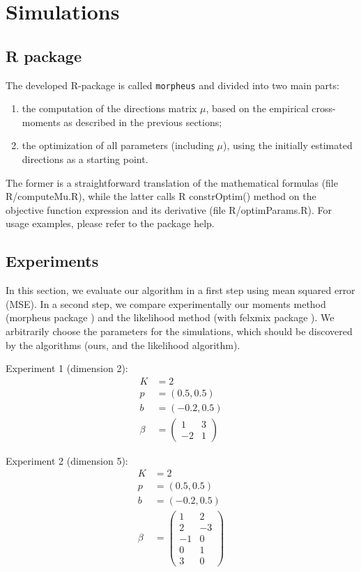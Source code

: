 \section{Simulations}

\subsection{R package}

The developed R-package is called \verb"morpheus" \cite{Loum_Auder} and divided into two main parts:
\begin{enumerate}
	\item the computation of the directions matrix $\mu$, based on the empirical
		cross-moments as described in the previous sections;
	\item the optimization of all parameters (including $\mu$), using the initially estimated
		directions as a starting point.
\end{enumerate}
The former is a straightforward translation of the mathematical formulas (file R/computeMu.R),
while the latter calls R constrOptim() method on the objective function expression and its
derivative (file R/optimParams.R). For usage examples, please refer to the package help.

\subsection{Experiments}
In this section, we evaluate our algorithm in a first step using mean squared error (MSE). In a second step, we compare experimentally our moments method (morpheus package \cite{Loum_Auder}) and the likelihood method (with felxmix package \cite{bg-papers:Gruen+Leisch:2007a}). 
We arbitrarily choose the parameters for the simulations, which should be discovered by the algorithms (ours, and the likelihood algorithm).

Experiment 1 (dimension 2):
\begin{align*}
	K &= 2\\
	p &= (0.5, 0.5)\\
	b &= (-0.2, 0.5)\\
	\beta &=
		\begin{pmatrix}
		1 & 3\\
		-2 & 1
		\end{pmatrix}
\end{align*}

Experiment 2 (dimension 5):
\begin{align*}
	K &= 2\\
	p &= (0.5, 0.5)\\
	b &= (-0.2, 0.5)\\
	\beta &=
		\begin{pmatrix}
			1 & 2\\
			2 & -3\\
			-1 & 0\\
			0 & 1\\
			3 & 0
		\end{pmatrix}
\end{align*}

